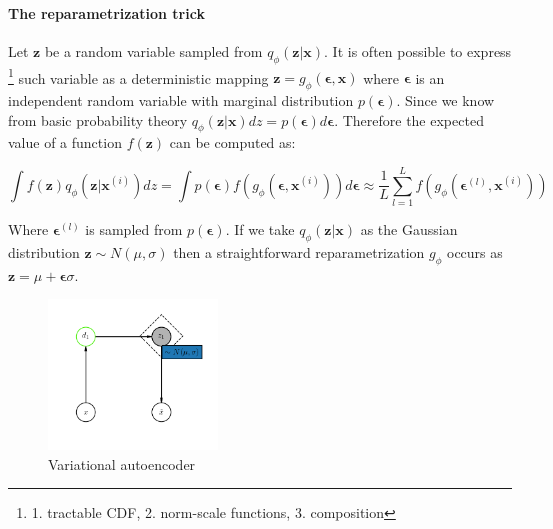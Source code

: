 \documentclass[11pt, english]{article}
\begin{document}
\paragraph{The reparametrization trick \newline \newline}

\par Let $\bm{z}$ be a random variable sampled from $   q_{\phi}(\bm{z} | \bm{x})$. It is often possible to express \footnote{1. tractable CDF, 2. norm-scale functions, 3. composition} such variable as a deterministic mapping $\bm{z} = g_{\phi}(\bm{\epsilon}, \bm{x})$ where $\bm{\epsilon}$ is an independent random variable with marginal distribution $p(\bm{\epsilon})$. Since we know from basic probability theory $q_{\phi}(\bm{z} | \bm{x})dz = p(\bm{\epsilon})d\bm{\epsilon}$. Therefore the expected value of a function $f(\bm{z})$ can be computed as:

\vspace{3mm}

\begin{equation}
    \int f(\bm{z})q_{\phi}(\bm{z} | \bm{x}^{(i)})dz = \int p(\bm{\epsilon})f(g_{\phi}(\bm{\epsilon}, \bm{x}^{(i)})) d\bm{\epsilon} \approx \frac{1}{L}\sum_{l=1}^{L}f(g_{\phi}(\bm{\epsilon}^{(l)}, \bm{x}^{(i)}))
\end{equation}

\vspace{3mm}

\par Where $\bm{\epsilon}^{(l)}$ is sampled from $p(\bm{\epsilon})$. If we take $q_{\phi}(\bm{z} | \bm{x})$ as the Gaussian distribution $\bm{z} \sim N(\mu, \sigma)$ then a straightforward reparametrization $g_{\phi}$ occurs as $\bm{z} = \mu + \bm{\epsilon} \sigma$.

\vspace{3mm}

\begin{figure}[H]
    \centering
    \includegraphics[width=0.4\textwidth]{vae.png}
    \caption{Variational autoencoder}
    \label{fig:vae}
\end{figure}
\end{document}
